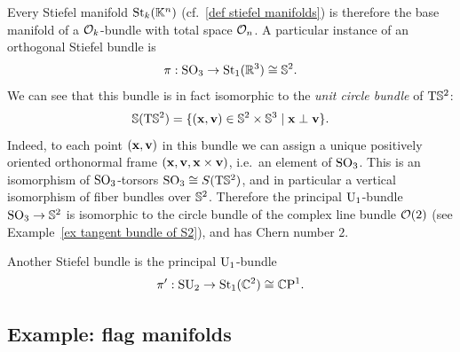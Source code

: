 \begin{example}\label{ex O2 Stiefel bundle}
    Every Stiefel manifold $\St_k(\bbK^n)$ (cf.\ \ref{def stiefel manifolds}) is therefore the base manifold of a $\calO_k$-bundle with total space $\calO_n$. A particular instance of an orthogonal Stiefel bundle is \[\pi:\SO_3\to \St_1(\bbR^3)\cong \bbS^2.\]
    We can see that this bundle is in fact isomorphic to the \emph{unit circle bundle} of $\T\bbS^2$:
    \[\bbS(\T\bbS^2)=\{(\bf{x},\bf{v})\in\bbS^2\times\bbS^3\mid \bf{x}\perp\bf{v}\}.\]
    Indeed, to each point $(\bf{x},\bf{v})$ in this bundle we can assign a unique positively oriented orthonormal frame $(\bf{x},\bf{v},\bf{x}\times\bf{v})$, i.e.\ an element of $\SO_3$. This is an isomorphism of $\SO_3$-torsors $\SO_3\cong S(\T\bbS^2)$, and in particular a vertical isomorphism of fiber bundles over $\bbS^2$.  Therefore the principal $\U_1$-bundle $\SO_3\to \bbS^2$ is isomorphic to the circle bundle of the complex line bundle $\calO(2)$ (see Example~\ref{ex tangent bundle of S2}), and has Chern number $2$.

    Another Stiefel bundle is the principal $\U_1$-bundle
    \[\pi':\SU_2\to \St_1(\bbC^2)\cong \CP^1.\]
\end{example}





\subsection{Example: flag manifolds}\label{sec: flag manifolds}


